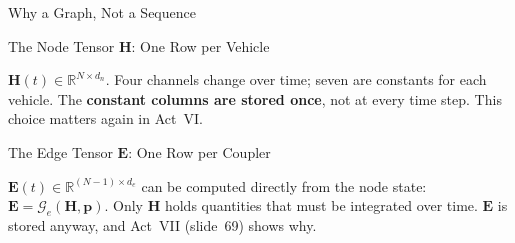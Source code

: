 \begin{frame}{Why a Graph, Not a Sequence}
  \vspace{0.4em}
  \centering

  \vspace{0.8em}
  \begin{minipage}{0.90\textwidth}\small
  \end{minipage}
\end{frame}

\begin{frame}{The Node Tensor $\mathbf{H}$: One Row per Vehicle}
  \vspace{0.6em}
  \centering
  \scalebox{0.86}{\nodeTensor}

  \vspace{1.0em}
  \begin{minipage}{0.88\textwidth}\small
    $\mathbf{H}(t) \in \mathbb{R}^{N \times d_n}$. Four channels change over time;
    seven are constants for each vehicle. The \textbf{constant columns are stored
    once}, not at every time step. This choice matters again in Act~VI.
  \end{minipage}
\end{frame}

\begin{frame}{The Edge Tensor $\mathbf{E}$: One Row per Coupler}
  \vspace{0.6em}
  \centering
  \scalebox{0.86}{\edgeTensor}

  \vspace{1.0em}
  \begin{minipage}{0.88\textwidth}\small
    $\mathbf{E}(t) \in \mathbb{R}^{(N-1) \times d_e}$ can be computed directly from
    the node state: $\mathbf{E} = \mathcal{G}_e(\mathbf{H}, \mathbf{p})$. Only
    $\mathbf{H}$ holds quantities that must be integrated over time.
    \alert{$\mathbf{E}$ is stored anyway}, and Act~VII (slide~69) shows why.
  \end{minipage}
\end{frame}


